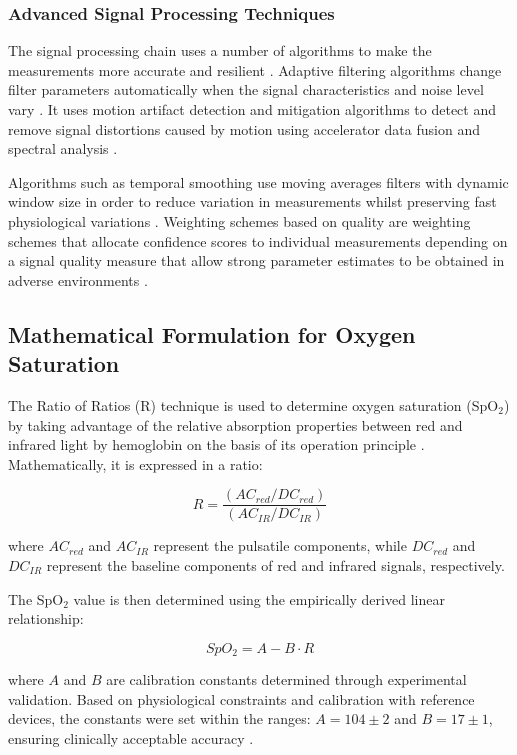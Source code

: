 \documentclass{ieeeaccess}
\begin{document}
\subsubsection{Advanced Signal Processing Techniques}

The signal processing chain uses a number of algorithms to make the measurements more accurate and resilient \cite{b5}. Adaptive filtering algorithms change filter parameters automatically when the signal characteristics and noise level vary \cite{b14}. It uses motion artifact detection and mitigation algorithms to detect and remove signal distortions caused by motion using accelerator data fusion and spectral analysis \cite{b34}.

Algorithms such as temporal smoothing use moving averages filters with dynamic window size in order to reduce variation in measurements whilst preserving fast physiological variations \cite{b11}. Weighting schemes based on quality are weighting schemes that allocate confidence scores to individual measurements depending on a signal quality measure that allow strong parameter estimates to be obtained in adverse environments \cite{b12}.

\subsection{Mathematical Formulation for Oxygen Saturation}

The Ratio of Ratios (R) technique is used to determine oxygen saturation (SpO$_2$) by taking advantage of the relative absorption properties between red and infrared light by hemoglobin on the basis of its operation principle \cite{b15}. Mathematically, it is expressed in a ratio:


\begin{equation}
R = \frac{(AC_{red}/DC_{red})}{(AC_{IR}/DC_{IR})}
\end{equation}

where $AC_{red}$ and $AC_{IR}$ represent the pulsatile components, while $DC_{red}$ and $DC_{IR}$ represent the baseline components of red and infrared signals, respectively.

The SpO$_2$ value is then determined using the empirically derived linear relationship:

\begin{equation}
SpO_2 = A - B \cdot R
\end{equation}

where $A$ and $B$ are calibration constants determined through experimental validation. Based on physiological constraints and calibration with reference devices, the constants were set within the ranges: $A = 104 \pm 2$ and $B = 17 \pm 1$, ensuring clinically acceptable accuracy \cite{b16}.
\end{document}
